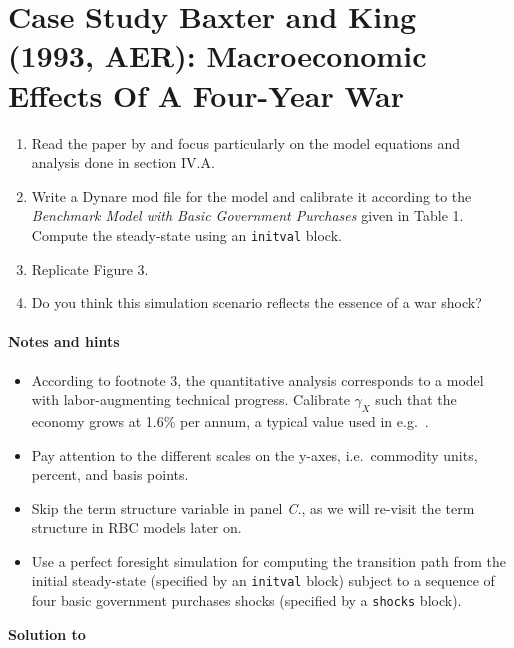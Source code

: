 \section[Case Study Baxter and King (1993, AER): Macroeconomic Effects Of A Four-Year War]{Case Study Baxter and King (1993, AER): Macroeconomic Effects Of A Four-Year War\label{ex:CaseStudy.BaxterKing.Figure3}}

\begin{enumerate}
    \item Read the paper by \textcite{Baxter.King_1993_FiscalPolicyGeneral} and focus particularly on the model equations and analysis done in section IV.A.
    \item Write a Dynare mod file for the model and calibrate it according to the \emph{Benchmark Model with Basic Government Purchases} given in Table 1.
    Compute the steady-state using an \texttt{initval} block.
    \item Replicate Figure 3.
    \item Do you think this simulation scenario reflects the essence of a war shock?
\end{enumerate}
\paragraph{Notes and hints}
\begin{itemize}
    \item According to footnote 3, the quantitative analysis corresponds to a model with labor-augmenting technical progress.
    Calibrate $\gamma_X$ such that the economy grows at 1.6\% per annum, a typical value used in e.g.\ \textcite{King.Plosser.Rebelo_1988_ProductionGrowthBusiness}.
    \item Pay attention to the different scales on the y-axes, i.e.\ commodity units, percent, and basis points.
    \item Skip the term structure variable in panel \emph{C.}, as we will re-visit the term structure in RBC models later on.
    \item Use a perfect foresight simulation for computing the transition path
      from the initial steady-state (specified by an \texttt{initval} block)
      subject to a sequence of four basic government purchases shocks (specified by a \texttt{shocks} block).    
\end{itemize}

\begin{solution}\textbf{Solution to }
\ifDisplaySolutions

\fi
\newpage
\end{solution}